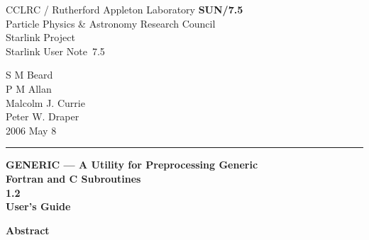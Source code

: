 \documentclass[twoside,11pt]{article}
\newcommand{\stardoccategory}  {Starlink User Note}
\newcommand{\stardocinitials}  {SUN}
\newcommand{\stardocnumber}    {7.5}
\newcommand{\stardocauthors}   {S M Beard \\ P M Allan\\ Malcolm J. Currie\\ Peter W. Draper}
\newcommand{\stardocdate}      {2006 May 8}
\newcommand{\stardoctitle}     {GENERIC --- A Utility for Preprocessing Generic
				\\ Fortran and C Subroutines}
\newcommand{\stardocversion}   {1.2}
\newcommand{\stardocmanual}    {User's Guide}
\newcommand{\stardocname}{\stardocinitials /\stardocnumber}
\renewcommand{\_}{{\tt\char'137}}     %
\newenvironment{latexonly}{}{}
\begin{document}
\thispagestyle{empty}

\begin{latexonly}
   CCLRC / {\sc Rutherford Appleton Laboratory} \hfill {\bf \stardocname}\\
   {\large Particle Physics \& Astronomy Research Council}\\
   {\large Starlink Project\\}
   {\large \stardoccategory\ \stardocnumber}
   \begin{flushright}
   \stardocauthors\\
   \stardocdate
   \end{flushright}
   \vspace{-4mm}
   \rule{\textwidth}{0.5mm}
   \vspace{5mm}
   \begin{center}
   {\Huge\bf  \stardoctitle \\ [2.5ex]}
   {\LARGE\bf \stardocversion \\ [4ex]}
   {\Huge\bf  \stardocmanual}
   \end{center}
   \vspace{5mm}

   \vspace{10mm}
   \begin{center}
      {\Large\bf Abstract}
   \end{center}
\end{latexonly}
\end{document}

